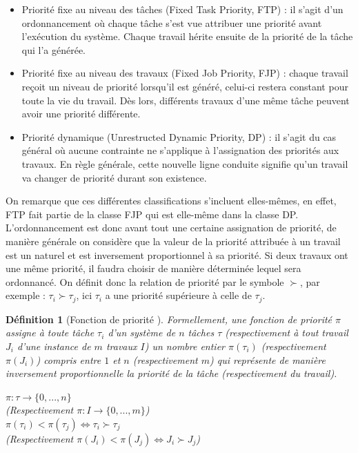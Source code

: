 \documentclass[a4paper]{report}
\theoremstyle{break}
\newtheorem{defin}{Définition}
\begin{document}
\begin{itemize}
\item Priorité fixe au niveau des tâches (Fixed Task Priority, FTP) : il s'agit d'un ordonnancement où chaque tâche s'est vue attribuer une priorité avant l'exécution du système. Chaque travail hérite ensuite de la priorité de la tâche qui l'a générée.
\item Priorité fixe au niveau des travaux (Fixed Job Priority, FJP) : chaque travail reçoit un niveau de priorité lorsqu'il est généré, celui-ci restera constant pour toute la vie du travail. Dès lors, différents travaux d'une même tâche peuvent avoir une priorité différente.
\item Priorité dynamique (Unrestructed Dynamic Priority, DP) : il s'agit du cas général où aucune contrainte ne s'applique à l'assignation des priorités aux travaux. En règle générale, cette nouvelle ligne conduite signifie qu'un travail va changer de priorité durant son existence.
\end{itemize}
On remarque que ces différentes classifications s'incluent elles-mêmes, en effet, FTP fait partie de la classe FJP qui est elle-même dans la classe DP.\\

L'ordonnancement est donc avant tout une certaine assignation de priorité, de manière générale on considère que la valeur de la priorité attribuée à un travail est un naturel et est inversement proportionnel à sa priorité. Si deux travaux ont une même priorité, il faudra choisir de manière déterminée lequel sera ordonnancé. On définit donc la relation de priorité par le symbole $\succ$, par exemple : $\tau_i \succ \tau_j$, ici $\tau_i$ a une priorité supérieure à celle de $\tau_j$.\\

\begin{defin}[Fonction de priorité \cite{santy2012ordonnancement}]
Formellement, une fonction de priorité $\pi$ assigne à toute tâche $\tau_i$ d'un système de $n$ tâches $\tau$ (respectivement à tout travail $J_i$ d'une instance de $m$ travaux $I$) un nombre entier $\pi(\tau_i)$ (respectivement $\pi(J_i)$) compris entre $1$ et $n$ (respectivement $m$) qui représente de manière inversement proportionnelle la priorité de la tâche (respectivement du travail).
\begin{center}
$\pi : \tau \rightarrow \{0,...,n \}$\\
(Respectivement $\pi : I \rightarrow \{0,...,m \}$)\\
$\pi(\tau_i) < \pi(\tau_j) \Leftrightarrow \tau_i \succ \tau_j$\\
(Respectivement $\pi(J_i) < \pi(J_j) \Leftrightarrow J_i \succ J_j$)
\end{center}
\end{defin}
\end{document}
